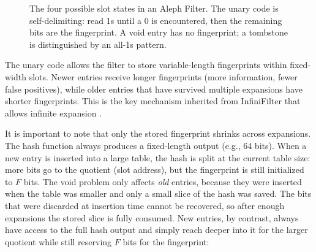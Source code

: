 \begin{figure}[H]
  \caption{The four possible slot states in an Aleph Filter. The unary 
           code is self-delimiting: read 1s until a 0 is encountered, 
           then the remaining bits are the fingerprint. A void entry has 
           no fingerprint; a tombstone is distinguished by an all-1s 
           pattern.}
  \label{fig:slot-format}
\end{figure}

The unary code allows the filter to store variable-length fingerprints 
within fixed-width slots. Newer entries receive longer fingerprints 
(more information, fewer false positives), while older entries that
have survived multiple expansions have shorter fingerprints. This is 
the key mechanism inherited from InfiniFilter that allows infinite 
expansion \cite{infinifilter}.

It is important to note that only the stored fingerprint shrinks 
across expansions. The hash function always produces a fixed-length 
output (e.g., 64 bits). When a new entry is inserted into a large 
table, the hash is split at the current table size: more bits go to 
the quotient (slot address), but the fingerprint is still initialized 
to $F$ bits. The void problem only affects \emph{old} entries, 
because they were inserted when the table was smaller and only a 
small slice of the hash was saved. The bits that were discarded at 
insertion time cannot be recovered, so after enough expansions the 
stored slice is fully consumed. New entries, by contrast, always have 
access to the full hash output and simply reach deeper into it for 
the larger quotient while still reserving $F$ bits for the fingerprint:

